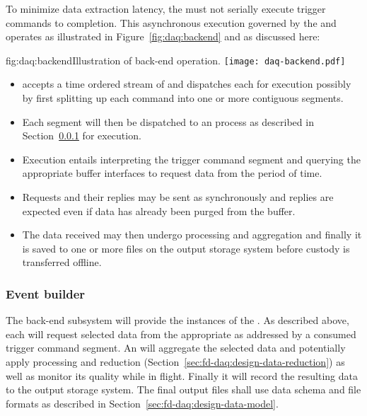 To minimize data extraction latency, the  must not serially execute trigger commands to completion. 
This asynchronous execution governed by the  and operates as illustrated in Figure~\ref{fig:daq:backend} and as discussed here:

\begin{dunefigure}{fig:daq:backend}{Illustration of   back-end operation.}
  \texttt{[image: daq-backend.pdf]}
\end{dunefigure}

\begin{itemize}
\item {} accepts a time ordered stream of  and dispatches each for execution possibly by first splitting up each command into one or more contiguous segments.
\item Each segment will then be dispatched to an  process as described in Section~\ref{sec:fd-daq:design-event-builder} for execution.
\item Execution entails interpreting the trigger command segment and querying the appropriate  buffer interfaces to request data from the period of time. 
\item Requests and their replies may be sent as synchronously and replies are expected even if data has already been purged from the  buffer.
\item The data received may then undergo processing and aggregation and finally it is saved to one or more files on the output storage system before custody is transferred offline.
\end{itemize}



\subsubsection{Event builder}
\label{sec:fd-daq:design-event-builder}

The  back-end subsystem will provide the instances of the .
As described above, each will request selected data from the appropriate  as addressed by a consumed trigger command segment. 
An  will aggregate the selected data and potentially apply processing and reduction (Section~\ref{sec:fd-daq:design-data-reduction}) as well as monitor its quality while in flight.
Finally it will record the resulting data to the output storage system.
The final output files shall use data schema and file formats as described in Section~\ref{sec:fd-daq:design-data-model}.


